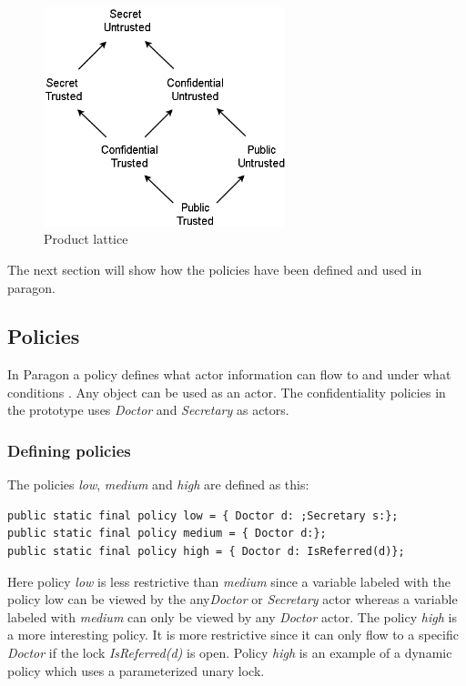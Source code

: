 \begin{figure}[H] 
	\centering
	\includegraphics[width=7cm]{figures/lattice_product.png}
	\caption{Product lattice}
	\label{fig:lattice_product}
\end{figure}


The next section will show how the policies have been defined and used in paragon. 



\subsection{Policies}\label{policies} 

In Paragon a policy defines what actor information can flow to and under what conditions 
\cite{paragonprogramming}. Any object can be used as an actor. The confidentiality policies in the prototype uses \emph{Doctor} and \emph{Secretary} as actors. 


\subsubsection{Defining policies}\label{policydef}
The policies \emph{low}, \emph{medium} and \emph{high} are defined as this:

\begin{lstlisting}
public static final policy low = { Doctor d: ;Secretary s:};
public static final policy medium = { Doctor d:};
public static final policy high = { Doctor d: IsReferred(d)};
\end{lstlisting}


Here policy \emph{low} is less restrictive than \emph{medium} since a variable labeled with the policy low can be viewed by the any\emph{Doctor} or \emph{Secretary} actor whereas a variable labeled with \emph{medium} can only be viewed by any \emph{Doctor} actor. The policy \emph{high} is a more interesting policy. It is more restrictive since it can only flow to a specific \emph{Doctor} if the lock \emph{IsReferred(d)} is open. Policy \emph{high} is an example of a dynamic policy which uses a parameterized unary lock.

